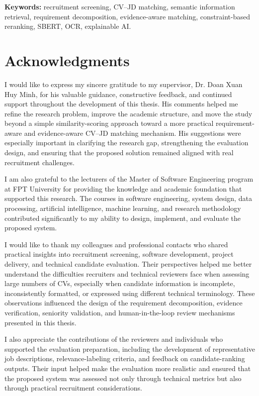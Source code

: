 \documentclass[12pt,a4paper,oneside]{report}
\begin{document}
\textbf{Keywords:} recruitment screening, CV--JD matching, semantic information retrieval, requirement decomposition, evidence-aware matching, constraint-based reranking, SBERT, OCR, explainable AI.

\chapter*{Acknowledgments}
I would like to express my sincere gratitude to my supervisor, Dr. Doan Xuan Huy Minh, for his valuable guidance, constructive feedback, and continued support throughout the development of this thesis. His comments helped me refine the research problem, improve the academic structure, and move the study beyond a simple similarity-scoring approach toward a more practical requirement-aware and evidence-aware CV--JD matching mechanism. His suggestions were especially important in clarifying the research gap, strengthening the evaluation design, and ensuring that the proposed solution remained aligned with real recruitment challenges.

I am also grateful to the lecturers of the Master of Software Engineering program at FPT University for providing the knowledge and academic foundation that supported this research. The courses in software engineering, system design, data processing, artificial intelligence, machine learning, and research methodology contributed significantly to my ability to design, implement, and evaluate the proposed system.

I would like to thank my colleagues and professional contacts who shared practical insights into recruitment screening, software development, project delivery, and technical candidate evaluation. Their perspectives helped me better understand the difficulties recruiters and technical reviewers face when assessing large numbers of CVs, especially when candidate information is incomplete, inconsistently formatted, or expressed using different technical terminology. These observations influenced the design of the requirement decomposition, evidence verification, seniority validation, and human-in-the-loop review mechanisms presented in this thesis.

I also appreciate the contributions of the reviewers and individuals who supported the evaluation preparation, including the development of representative job descriptions, relevance-labeling criteria, and feedback on candidate-ranking outputs. Their input helped make the evaluation more realistic and ensured that the proposed system was assessed not only through technical metrics but also through practical recruitment considerations.
\end{document}
